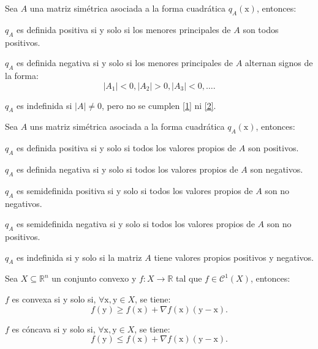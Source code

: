 \documentclass[8pt,a4paper]{extarticle}
\begin{document}
\begin{multicols}{3}
	\newpage

	\begin{boxtheo}
		Sea $A$ una matriz simétrica asociada a la forma cuadrática $q_A(\mathrm{x})$, entonces:
		\begin{eqlist}
			\item\label{1}$q_A$ es definida positiva si y solo si los menores principales de $A$ son todos positivos.
			\item\label{2} $q_A$ es definida negativa si y solo si los menores principales de $A$ alternan signos de la forma:
			\[
				\left| A_1 \right| < 0, \left| A_2 \right| > 0, \left| A_3 \right| < 0, \ldots
				.\]
			\item $q_A$ es indefinida si $\left| A \right| \neq 0$, pero no se cumplen \ref{1} ni \ref{2}.
		\end{eqlist}
	\end{boxtheo}

	\begin{boxtheo}
		Sea $A$ uns matriz simétrica asociada a la forma cuadrática $q_A(\mathrm{x})$, entonces:
		\begin{eqlist}
			\item $q_A$ es definida positiva si y solo si todos los valores propios de $A$ son positivos.
			\item $q_A$ es definida negativa si y solo si todos los valores propios de $A$ son negativos.
			\item $q_A$ es semidefinida positiva si y solo si todos los valores propios de $A$ son no negativos.
			\item $q_A$ es semidefinida negativa si y solo si todos los valores propios de $A$ son no positivos.
			\item $q_A$ es indefinida si y solo si la matriz $A$ tiene valores propios positivos y negativos.
		\end{eqlist}
	\end{boxtheo}

	\begin{boxtheo}
		Sea $X \subseteq \mathbb{R}^n$ un conjunto convexo y $f : X \to \mathbb{R}$ tal que $f \in \mathcal{C}^1(X)$, entonces:
		\begin{eqlist}
			\item $f$ es convexa si y solo si, $\forall \mathrm{x}, \mathrm{y} \in X$, se tiene:
			\[
				f(\mathrm{y}) \ge f(\mathrm{x}) + \nabla f(\mathrm{x})(\mathrm{y} - \mathrm{x})
				.\]
			\item $f$ es cóncava si y solo si, $\forall \mathrm{x}, \mathrm{y} \in X$, se tiene:
			\[
				f(\mathrm{y}) \le f(\mathrm{x}) + \nabla f(\mathrm{x})(\mathrm{y} - \mathrm{x})
				.\]
		\end{eqlist}
	\end{boxtheo}


\end{multicols}
\end{document}
